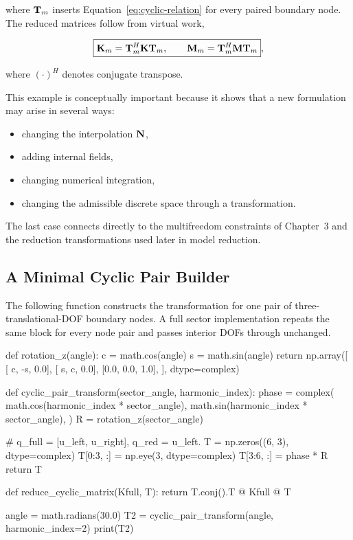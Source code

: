 where $\mathbf{T}_m$ inserts Equation~\eqref{eq:cyclic-relation} for every paired
boundary node. The reduced matrices follow from virtual work,

\begin{equation}\label{eq:cyclic-reduced-matrices}
    \boxed{
    \mathbf{K}_m=\mathbf{T}_m^H\mathbf{K}\mathbf{T}_m,
    \qquad
    \mathbf{M}_m=\mathbf{T}_m^H\mathbf{M}\mathbf{T}_m
    },
\end{equation}

where $(\cdot)^H$ denotes conjugate transpose.

This example is conceptually important because it shows that a new formulation
may arise in several ways:

\begin{itemize}
    \item changing the interpolation $\mathbf{N}$,
    \item adding internal fields,
    \item changing numerical integration,
    \item changing the admissible discrete space through a transformation.
\end{itemize}

The last case connects directly to the multifreedom constraints of Chapter~3
and the reduction transformations used later in model reduction.

\subsection{A Minimal Cyclic Pair Builder}

The following function constructs the transformation for one pair of
three-translational-DOF boundary nodes. A full sector implementation repeats the
same block for every node pair and passes interior DOFs through unchanged.

\begin{python}
def rotation_z(angle):
    c = math.cos(angle)
    s = math.sin(angle)
    return np.array([
        [ c, -s, 0.0],
        [ s,  c, 0.0],
        [0.0, 0.0, 1.0],
    ], dtype=complex)


def cyclic_pair_transform(sector_angle, harmonic_index):
    phase = complex(
        math.cos(harmonic_index * sector_angle),
        math.sin(harmonic_index * sector_angle),
    )
    R = rotation_z(sector_angle)

    # q_full = [u_left, u_right], q_red = u_left.
    T = np.zeros((6, 3), dtype=complex)
    T[0:3, :] = np.eye(3, dtype=complex)
    T[3:6, :] = phase * R
    return T


def reduce_cyclic_matrix(Kfull, T):
    return T.conj().T @ Kfull @ T


angle = math.radians(30.0)
T2 = cyclic_pair_transform(angle, harmonic_index=2)
print(T2)
\end{python}

